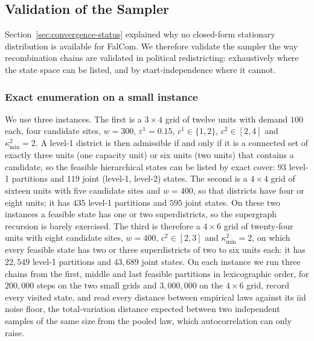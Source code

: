 \documentclass[preprint,12pt,authoryear]{elsarticle}
\theoremstyle{definition}
\begin{document}
\FloatBarrier
\subsection{Validation of the Sampler}
\label{sec:exp-convergence}

Section~\ref{sec:convergence-status} explained why no closed-form stationary distribution is available for FalCom. We therefore validate the sampler the way recombination chains are validated in political redistricting: exhaustively where the state space can be listed, and by start-independence where it cannot.

\FloatBarrier
\subsubsection{Exact enumeration on a small instance}
\label{sec:exp-enumeration}

We use three instances. The first is a $3\times4$ grid of twelve units with demand $100$ each, four candidate sites, $w = 300$, $\varepsilon^1 = 0.15$, $c^1 \in \{1,2\}$, $c^2 \in [2,4]$ and $\kappa^2_{\min} = 2$. A level-1 district is then admissible if and only if it is a connected set of exactly three units (one capacity unit) or six units (two units) that contains a candidate, so the feasible hierarchical states can be listed by exact cover: $93$ level-1 partitions and $119$ joint (level-1, level-2) states. The second is a $4\times4$ grid of sixteen units with five candidate sites and $w = 400$, so that districts have four or eight units; it has $435$ level-1 partitions and $595$ joint states. On these two instances a feasible state has one or two superdistricts, so the supergraph recursion is barely exercised. The third is therefore a $4\times6$ grid of twenty-four units with eight candidate sites, $w = 400$, $c^2 \in [2,3]$ and $\kappa^2_{\min} = 2$, on which every feasible state has two or three superdistricts of two to six units each: it has $22{,}549$ level-1 partitions and $43{,}689$ joint states. On each instance we run three chains from the first, middle and last feasible partitions in lexicographic order, for $200{,}000$ steps on the two small grids and $3{,}000{,}000$ on the $4\times6$ grid, record every visited state, and read every distance between empirical laws against its iid noise floor, the total-variation distance expected between two independent samples of the same size from the pooled law, which autocorrelation can only raise.
\end{document}
